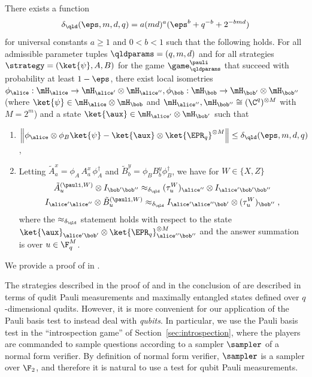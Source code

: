 \begin{theorem}
  \label{thm:pauli}
There exists a function 
\[\delta_{\qld}(\eps,m,d,q) = a(md)^a(\eps^b + q^{-b} + 2^{-bmd})\]
 for universal constants $a \geq 1$ and $0 < b < 1$ such that the following holds. For all admissible parameter tuples $\qldparams = (q,m,d)$ and for all strategies $\strategy = (\ket{\psi},A,B)$ for the game $\game^\pauli_\qldparams$ that succeed with probability at least $1 - \eps$, there exist local isometries $\phi_\alice: \mH_\alice \to \mH_{\alice'} \otimes \mH_{\alice''},\phi_\bob: \mH_\bob \to \mH_{\bob'} \otimes \mH_{\bob''}$ (where $\ket{\psi} \in \mH_\alice \otimes \mH_\bob$ and $\mH_{\alice''},\mH_{\bob''} \cong (\C^q)^{\otimes M}$ with $M = 2^m$) and a state $\ket{\aux} \in \mH_{\alice'} \otimes \mH_{\bob'}$ such that 
\begin{enumerate}
    \item $\left \| \phi_\alice \otimes \phi_B \ket{\psi} - \ket{\aux} \otimes \ket{\EPR_q}^{\otimes M}  \right \| \leq \delta_{\qld}(\eps,m,d,q)$,
    \item Letting $\tilde{A}^x_a = \phi_A\, A^x_a \, \phi_A^\dagger$ and $\tilde{B}^y_b = \phi_B B^y_b \phi_B^\dagger$, we have for $W \in \{X,Z\}$
    \begin{gather*}
        \tilde{A}^{(\pauli,W)}_u \otimes I_{\bob'\bob''} \approx_{\delta_{\qld}} (\tau^W_u)_{\alice''} \otimes I_{\alice' \bob' \bob''} \\
        I_{\alice'\alice''} \otimes \tilde{B}^{(\pauli,W)}_u    \approx_{\delta_{\qld}} I_{\alice' \alice'' \bob'} \otimes (\tau^W_u)_{\bob''}\;,
    \end{gather*}
    where the $\approx_{\delta_{\qld}}$ statement holds with respect to the state $\ket{\aux}_{\alice'\bob'} \otimes \ket{\EPR_q}^{\otimes M}_{\alice''\bob''}$ and the answer summation is over $u \in \F_q^M$.
\end{enumerate}
\end{theorem}

We provide a proof of  in . 


The strategies described in the proof of  and in the conclusion of  are described in terms of qudit Pauli measurements and maximally entangled states defined over $q$-dimensional qudits. 
However, it is more convenient for our application of the Pauli basis test to
instead deal with \emph{qubits}.
In particular, we use the Pauli basis test in the ``introspection game'' of
Section~\ref{sec:introspection}, where the players are commanded to sample
questions according to a sampler $\sampler$ of a normal form verifier.
By definition of normal form verifier, $\sampler$ is a sampler over $\F_2$, and
therefore it is natural to use a test for qubit Pauli measurements.

